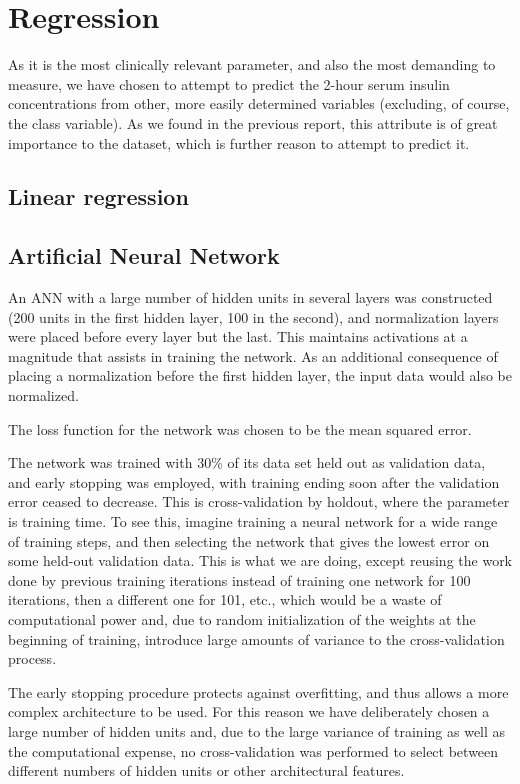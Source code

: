 \section{Regression}
As it is the most clinically relevant parameter,
and also the most demanding to measure,
we have chosen to attempt to predict the 2-hour serum insulin concentrations
from other, more easily determined variables
(excluding, of course, the class variable).
As we found in the previous report,
this attribute is of great importance to the dataset,
which is further reason to attempt to predict it.

\subsection{Linear regression}

\subsection{Artificial Neural Network}
An ANN with a large number of hidden units in several layers was constructed
(200 units in the first hidden layer, 100 in the second),
and normalization layers were placed before every layer but the last.
This maintains activations at a magnitude that assists in training the network.
As an additional consequence of placing a normalization before the first hidden layer,
the input data would also be normalized.

The loss function for the network was chosen to be the mean squared error.

The network was trained with 30\% of its data set held out as validation data,
and early stopping was employed, with training ending soon after the validation error
ceased to decrease.
This is cross-validation by holdout,
where the parameter is training time.
To see this,
imagine training a neural network for a wide range of training steps,
and then selecting the network that gives the lowest error
on some held-out validation data.
This is what we are doing,
except reusing the work done by previous training iterations
instead of training one network for 100 iterations,
then a different one for 101, etc.,
which would be a waste of computational power
and, due to random initialization of the weights at the beginning of training,
introduce large amounts of variance to the cross-validation process.

The early stopping procedure protects against overfitting,
and thus allows a more complex architecture to be used.
For this reason we have deliberately chosen a large number of hidden units
and, due to the large variance of training as well as the computational expense,
no cross-validation was performed to select between different numbers of hidden units
or other architectural features.


